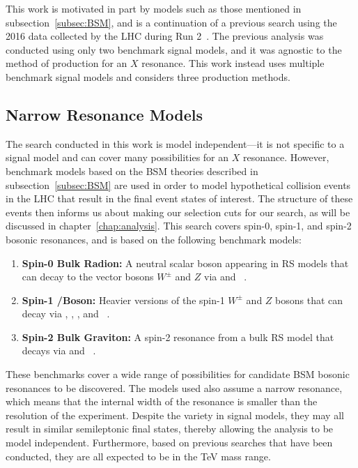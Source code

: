 This work is motivated in part by models such as those mentioned in subsection~\ref{subsec:BSM}, and is a continuation of a previous search using the 2016 data collected by the LHC during Run 2~\cite{Sirunyan_18}.
The previous analysis was conducted using only two benchmark signal models, and it was agnostic to the method of production for an $X$ resonance.
This work instead uses multiple benchmark signal models and considers three production methods.

\subsection{Narrow Resonance Models}
\label{subsec:benchmark}

The search conducted in this work is model independent---it is not specific to a signal model and can cover many possibilities for an $X$ resonance.
However, benchmark models based on the BSM theories described in subsection~\ref{subsec:BSM} are used in order to model hypothetical collision events in the LHC that result in the final event states of interest.
The structure of these events then informs us about making our selection cuts for our search, as will be discussed in chapter~\ref{chap:analysis}.
This search covers spin-0, spin-1, and spin-2 bosonic resonances, and is based on the following benchmark models:
\begin{enumerate}
  \item \textbf{Spin-0 Bulk Radion:} A neutral scalar boson appearing in RS models that can decay to the vector bosons $W^\pm$ and $Z$ via \RadtoWW and \RadtoZZ~\cite{Goldberger_1999,Goldberger_2000}.
  \item \textbf{Spin-1 \Wpr/\Zpr Boson:} Heavier versions of the spin-1 $W^\pm$ and $Z$ bosons that can decay via \WprtoWZ, \WprtoWH, \ZprtoWW, and \ZprtoZH~\cite{Pappadopulo_2014}.
  \item \textbf{Spin-2 Bulk Graviton:} A spin-2 resonance from a bulk RS model that decays via \GBulktoWW and \GBulktoZZ~\cite{Fitzpatrick_2007,PhysRevD.76.036006}.
\end{enumerate}

These benchmarks cover a wide range of possibilities for candidate BSM bosonic resonances to be discovered.
The models used also assume a narrow resonance, which means that the internal width of the resonance is smaller than the resolution of the experiment.
Despite the variety in signal models, they may all result in similar semileptonic final states, thereby allowing the analysis to be model independent.
Furthermore, based on previous searches that have been conducted, they are all expected to be in the TeV mass range.

